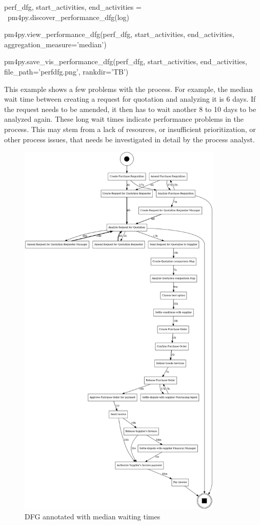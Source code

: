 \begin{samepage}
\begin{pythoncode}
perf_dfg, start_activities, end_activities = \
    pm4py.discover_performance_dfg(log)
    
pm4py.view_performance_dfg(perf_dfg, 
    start_activities, end_activities, 
    aggregation_measure='median')

pm4py.save_vis_performance_dfg(perf_dfg, 
    start_activities, end_activities, 
    file_path='perfdfg.png', rankdir='TB')
\end{pythoncode}
\end{samepage}

This example shows a few problems with the process. For example, the median wait time between creating a request for quotation and analyzing it is 6 days. If the request needs to be amended, it then has to wait another 8 to 10 days to be analyzed again. These long wait times indicate performance problems in the process. This may stem from a lack of resources, or insufficient prioritization, or other process issues, that needs be investigated in detail by the process analyst. 

\begin{figure}
\centering

\includegraphics[height=7.25in]{perfdfg.png}
\caption{DFG annotated with median waiting times}
\label{fig:performance_dfg}
\end{figure}

